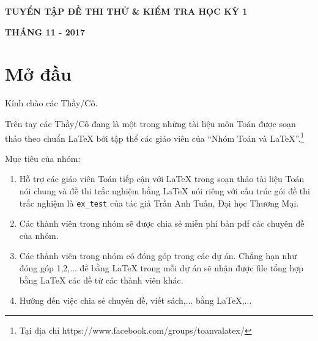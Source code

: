 \documentclass[12pt,a4paper,oneside]{book}
\renewcommand{\baselinestretch}{1.4}
\begin{document}
\begin{titlepage}
\begin{tcolorbox}[width=.99\textwidth,height=.99\textheight,arc = 2mm, arc is angular]
\begin{flushright}
				\vspace{1cm}
				
				\textbf{\fontsize{18}{3pt}\selectfont TUYỂN TẬP ĐỀ THI THỬ \& KIỂM TRA HỌC KỲ 1}
				\vspace{1cm}
				
				
			\end{flushright}
			\vspace{3cm}
			\begin{center}
			\end{center}
\vfill
			\begin{center}
				\fontsize{17}{0}\textbf{THÁNG 11 - 2017}
			\end{center}
		\end{tcolorbox}
	\end{titlepage}
	\pagestyle{empty}
	\renewcommand{\headrulewidth}{0.4pt}
	
	\renewcommand{\baselinestretch}{1.3}
	
	
	\pagestyle{fancy}
	\lhead{\empty}
	\rhead{\empty}
	\lfoot{\currfilename}
	\tableofcontents
	\chapter*{Mở đầu}
	Kính chào các Thầy/Cô.
	
	\vspace{0.6cm}
	
	\noindent Trên tay các Thầy/Cô đang là một trong những tài liệu môn Toán được soạn thảo theo chuẩn \LaTeX{} bởi tập thể các giáo viên của ``Nhóm Toán và LaTeX''.\footnote{Tại địa chỉ https://www.facebook.com/groups/toanvalatex/}
	
	\vspace{0.6cm}
	
	\noindent Mục tiêu của nhóm: 
	\begin{enumerate}
		\item Hỗ trợ các giáo viên Toán tiếp cận với \LaTeX{} trong soạn thảo tài liệu Toán nói chung và đề thi trắc nghiệm bằng \LaTeX{} nói riêng với cấu trúc gói đề thi trắc nghiệm là \texttt{ex\_test} của tác giả Trần Anh Tuấn, Đại học Thương Mại.
		\item Các thành viên trong nhóm sẽ được chia sẻ miễn phí bản pdf  các chuyên đề của nhóm.
		\item Các thành viên trong nhóm có đóng góp trong các dự án. Chẳng hạn như đóng góp 1,2,... đề bằng \LaTeX{} trong mỗi dự án sẽ nhận được file tổng hợp bằng \LaTeX{} các đề từ các thành viên khác.
		\item Hướng đến việc chia sẻ chuyên đề, viết sách,... bằng \LaTeX,...
	\end{enumerate}
\end{document}
